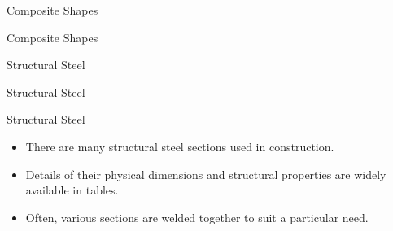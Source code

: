 \documentclass[9pt, xcolor={svgnames, x11names},professionalfonts]{beamer}
\begin{document}
\begin{frame}{Composite Shapes}
	\begin{myexer}{}{}
		\small
		\mini[0.65]{
			
		}
		\hfill

	\end{myexer}
\end{frame}


\begin{frame}{Composite Shapes}
	\begin{myexer}{}{}
		\mini[0.65]{
			
		}
		\hfill
	\end{myexer}
\end{frame}


\begin{frame}{Structural Steel}
	\centering


\end{frame}


\begin{frame}{Structural Steel}
	\centering

\end{frame}


\begin{frame}{Structural Steel}
	\centering
	\begin{itemize}
		\item There are many structural steel sections used in construction.
		\item Details of their physical dimensions and structural properties are widely available in tables. 	     
		\item Often, various sections are welded together to suit a particular need.
	\end{itemize}

\end{frame}
\end{document}
